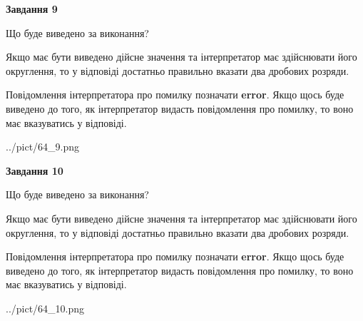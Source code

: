 \documentclass[12pt, ukrainian]{article}
\begin{document}
{\begin {Large}
{\begin {center}\textbf{Завдання 9}\end {center}}\par
Що буде виведено за виконання? \par

Якщо має бути виведено дійсне значення та інтерпретатор має здійснювати його округлення, 
то у відповіді достатньо правильно вказати два дробових розряди.

Повідомлення інтерпретатора про помилку позначати \textbf{error}.
Якщо щось буде виведено до того, як інтерпретатор видасть повідомлення про помилку, 
то воно має вказуватись у відповіді. \par

\begin{center}
	{../pict/64_9.png}
\end{center}
\newpage

{\begin {center}\textbf{Завдання 10}\end {center}}\par
Що буде виведено за виконання? \par

Якщо має бути виведено дійсне значення та інтерпретатор має здійснювати його округлення, 
то у відповіді достатньо правильно вказати два дробових розряди.

Повідомлення інтерпретатора про помилку позначати \textbf{error}.
Якщо щось буде виведено до того, як інтерпретатор видасть повідомлення про помилку, 
то воно має вказуватись у відповіді. \par

\begin{center}
	{../pict/64_10.png}
\end{center}
\newpage

\end {Large}}
\end{document}
